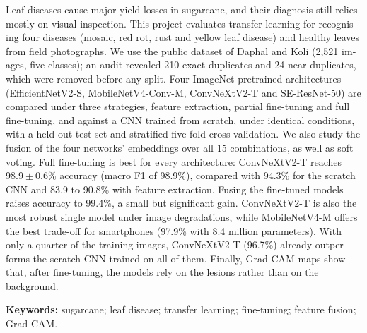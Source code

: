 \begin{otherlanguage}{english}
Leaf diseases cause major yield losses in sugarcane, and their diagnosis still relies mostly on visual inspection. This project evaluates transfer learning for recognising four diseases (mosaic, red rot, rust and yellow leaf disease) and healthy leaves from field photographs. We use the public dataset of Daphal and Koli (2,521 images, five classes); an audit revealed 210 exact duplicates and 24 near-duplicates, which were removed before any split. Four ImageNet-pretrained architectures (EfficientNetV2-S, MobileNetV4-Conv-M, ConvNeXtV2-T and SE-ResNet-50) are compared under three strategies, feature extraction, partial fine-tuning and full fine-tuning, and against a CNN trained from scratch, under identical conditions, with a held-out test set and stratified five-fold cross-validation. We also study the fusion of the four networks' embeddings over all 15 combinations, as well as soft voting. Full fine-tuning is best for every architecture: ConvNeXtV2-T reaches $98.9 \pm 0.6$\% accuracy (macro F1 of 98.9\%), compared with 94.3\% for the scratch CNN and 83.9 to 90.8\% with feature extraction. Fusing the fine-tuned models raises accuracy to 99.4\%, a small but significant gain. ConvNeXtV2-T is also the most robust single model under image degradations, while MobileNetV4-M offers the best trade-off for smartphones (97.9\% with 8.4 million parameters). With only a quarter of the training images, ConvNeXtV2-T (96.7\%) already outperforms the scratch CNN trained on all of them. Finally, Grad-CAM maps show that, after fine-tuning, the models rely on the lesions rather than on the background.

\medskip
\noindent\textbf{Keywords:} sugarcane; leaf disease; transfer learning; fine-tuning; feature fusion; Grad-CAM.
\end{otherlanguage}

\clearpage
